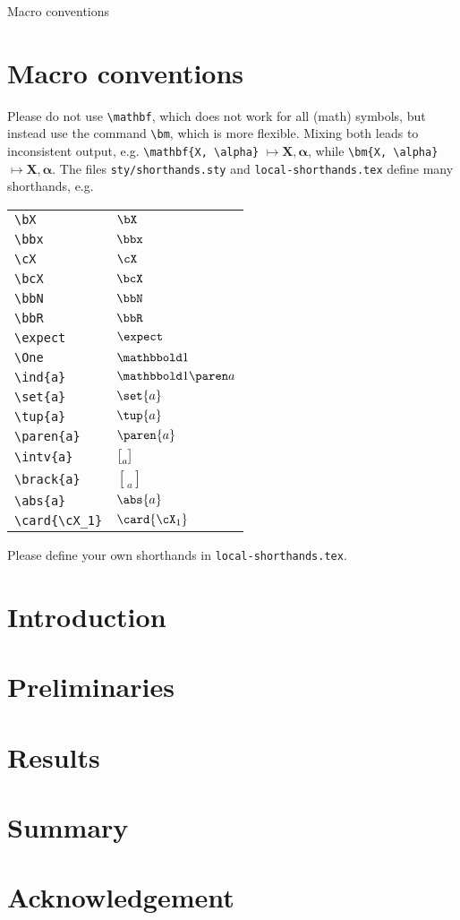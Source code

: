 \documentclass{IEEEtran}
\begin{document}
\begin{anfxnote}[author=JR]{Macro conventions}
  \section*{Macro conventions}
  \label{meta:macros}
  \raggedright
  Please do not use \verb|\mathbf|, which does not work for all (math) symbols,
  but instead use the command \verb|\bm|, which is more flexible.
  Mixing both leads to inconsistent output,
  e.g. \verb|\mathbf{X, \alpha}| $\mapsto \mathbf{X, \alpha}$,
  while \verb|\bm{X, \alpha}| $\mapsto \bm{X, \alpha}$.
  The files \verb|sty/shorthands.sty| and \verb|local-shorthands.tex|
  define many shorthands, e.g.

  \begin{tabular}{ll}
    \verb|\bX| & $\bX$ \\
    \verb|\bbx| & $\bbx$ \\
    \verb|\cX| & $\cX$ \\
    \verb|\bcX| & $\bcX$ \\
    \verb|\bbN| & $\bbN$ \\
    \verb|\bbR| & $\bbR$ \\
    \verb|\expect| & $\expect$ \\
    \verb|\One| & $\One$ \\
    \verb|\ind{a}| & $\ind{a}$ \\
    \verb|\set{a}| & $\set{a}$ \\
    \verb|\tup{a}| & $\tup{a}$ \\
    \verb|\paren{a}| & $\paren{a}$ \\
    \verb|\intv{a}| & $\brack{a}$ \\
    \verb|\brack{a}| & $\brack{a}$ \\
    \verb|\abs{a}| & $\abs{a}$ \\
    \verb|\card{\cX_1}| & $\card{\cX_1}$ \\
  \end{tabular}

  \noindent
  Please define your own shorthands in \verb|local-shorthands.tex|.
\end{anfxnote}


\section{Introduction}


\section{Preliminaries}


\section{Results}


\section{Summary}


\section*{Acknowledgement}

\printbibliography

\newpage
\listoffixmes
\end{document}
